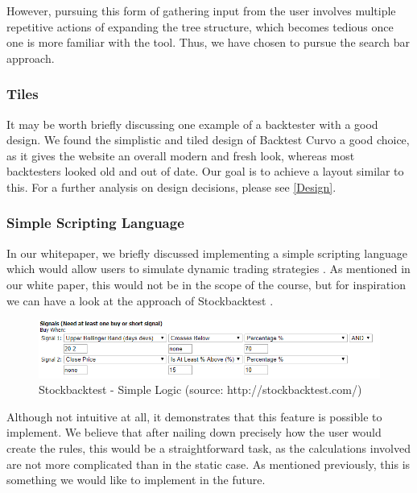 \documentclass[main.tex]{subfiles}
\begin{document}
However, pursuing this form of gathering input from the user involves multiple repetitive actions of expanding the tree structure, which becomes tedious once one is more familiar with the tool. Thus, we have chosen to pursue the search bar approach.


\subsubsection*{Tiles}

It may be worth briefly discussing one example of a backtester with a good design. We found the simplistic and tiled design of Backtest Curvo \cite{backtestcurvo} a good choice, as it gives the website an overall modern and fresh look, whereas most backtesters looked old and out of date. Our goal is to achieve a layout similar to this. For a further analysis on design decisions, please see \ref{Design}.

\subsubsection*{Simple Scripting Language}

In our whitepaper, we briefly discussed implementing a simple scripting language which would allow users to simulate dynamic trading strategies \cite{WP}. As mentioned in our white paper, this would not be in the scope of the course, but for inspiration we can have a look at the approach of Stockbacktest \cite{stockbacktest}.

\begin{figure}[H]
   \centering
   \includegraphics[scale=0.7]{02Background/02Pictures/stockbacktest.png}
   \caption{Stockbacktest - Simple Logic (source: http://stockbacktest.com/)}
\end{figure}

Although not intuitive at all, it demonstrates that this feature is possible to implement. We believe that after nailing down precisely how the user would create the rules, this would be a straightforward task, as the calculations involved are not more complicated than in the static case. As mentioned previously, this is something we would like to implement in the future.
\end{document}
